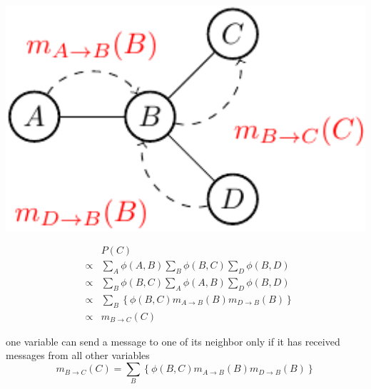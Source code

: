 \begin{minipage}[c]{0.4\textwidth}
      \centering
      \includegraphics[width=1.1\textwidth]{./Figures/message_passing_2}
\end{minipage}
\begin{minipage}[c]{0.6\textwidth}
 \begin{equation*}
  \begin{array}{rcl}
  & & P(C) \\
  &\propto& \sum_{A}\phi(A,B) \sum_B \phi(B,C) \sum_D \phi(B,D)\\ 
  &\propto& \sum_B \phi(B,C)  \sum_{A}\phi(A,B) \sum_D \phi(B,D)\\ 
  &\propto& \sum_{B} \left\{   \phi(B,C) m_{A\rightarrow B}(B) m_{D\rightarrow B}(B) \right\} \\
  &\propto& m_{B\rightarrow C}(C)
  \end{array}
 \end{equation*}
\end{minipage}

  one variable can send a message to one of its neighbor only if it has received messages from all other variables  
  \begin{equation*}
   m_{B\rightarrow C}(C)=\sum_{B} \left\{   \phi(B,C) m_{A\rightarrow B}(B) m_{D\rightarrow B}(B) \right\}
  \end{equation*}


